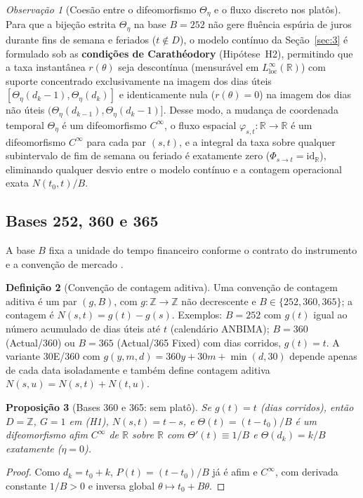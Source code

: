 \documentclass[11pt, a4paper]{article}
\theoremstyle{definition}
\newtheorem{definicao}{Definição}[section]
\theoremstyle{plain}
\newtheorem{proposicao}[definicao]{Proposição}
\theoremstyle{remark}
\newtheorem{observacao}[definicao]{Observação}
\begin{document}
\begin{observacao}[Coesão entre o difeomorfismo $\Theta_\eta$ e o fluxo discreto nos platôs]\label{obs:2.3}
Para que a bijeção estrita $\Theta_\eta$ na base $B = 252$ não gere fluência espúria de juros durante fins de semana e feriados ($t \notin D$), o modelo contínuo da Seção~\ref{sec:3} é formulado sob as \textbf{condições de Carathéodory} (Hipótese~H2), permitindo que a taxa instantânea $r(\theta)$ seja descontínua (mensurável em $L^\infty_{\text{loc}}(\mathbb{R})$) com suporte concentrado exclusivamente na imagem dos dias úteis $[\Theta_\eta(d_k - 1), \Theta_\eta(d_k)]$ e identicamente nula ($r(\theta) = 0$) na imagem dos dias não úteis $(\Theta_\eta(d_{k-1}), \Theta_\eta(d_k - 1)]$. Desse modo, a mudança de coordenada temporal $\Theta_\eta$ é um difeomorfismo $C^\infty$, o fluxo espacial $\varphi_{s,t} : \mathbb{R} \to \mathbb{R}$ é um difeomorfismo $C^\infty$ para cada par $(s,t)$, e a integral da taxa sobre qualquer subintervalo de fim de semana ou feriado é exatamente zero ($\Phi_{s \to t} = \mathrm{id}_{\mathbb{R}}$), eliminando qualquer desvio entre o modelo contínuo e a contagem operacional exata $N(t_0, t)/B$.
\end{observacao}

\subsection{Bases 252, 360 e 365}\label{sec:2.1}

A base $B$ fixa a unidade do tempo financeiro conforme o contrato do instrumento e a convenção de mercado \cite{AssafNeto, Fabozzi2006, ISDA2006}.

\begin{definicao}[Convenção de contagem aditiva]\label{def:2.4}
Uma convenção de contagem aditiva é um par $(g, B)$, com $g : \mathbb{Z} \to \mathbb{Z}$ não decrescente e $B \in \{252, 360, 365\}$; a contagem é $N(s,t) = g(t) - g(s)$. Exemplos: $B = 252$ com $g(t)$ igual ao número acumulado de dias úteis até $t$ (calendário ANBIMA); $B = 360$ (Actual/360) ou $B = 365$ (Actual/365 Fixed) com dias corridos, $g(t) = t$. A variante 30E/360 com $g(y,m,d) = 360y + 30m + \min(d, 30)$ depende apenas de cada data isoladamente e também define contagem aditiva $N(s,u) = N(s,t) + N(t,u)$.
\end{definicao}

\begin{proposicao}[Bases 360 e 365: sem platô]\label{prop:2.5}
Se $g(t) = t$ (dias corridos), então $D = \mathbb{Z}$, $G = 1$ em (H1), $N(s,t) = t - s$, e $\Theta(t) = (t - t_0)/B$ é um difeomorfismo afim $C^\infty$ de $\mathbb{R}$ sobre $\mathbb{R}$ com $\Theta'(t) \equiv 1/B$ e $\Theta(d_k) = k/B$ exatamente ($\eta = 0$).
\end{proposicao}
\begin{proof}
Como $d_k = t_0 + k$, $P(t) = (t - t_0)/B$ já é afim e $C^\infty$, com derivada constante $1/B > 0$ e inversa global $\theta \mapsto t_0 + B\theta$.
\end{proof}
\end{document}
